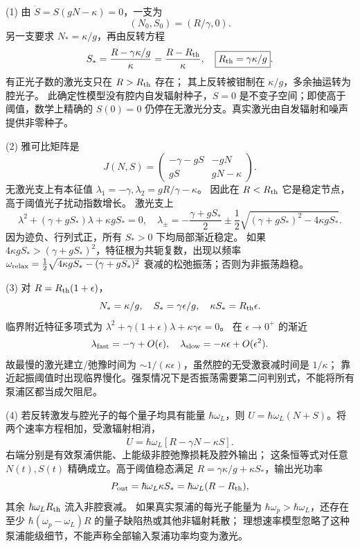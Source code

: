 (1) 由 \(\dot S=S(gN-\kappa)=0\)，一支为
\[
(N_0,S_0)=(R/\gamma,0).
\]
另一支要求 \(N_*=\kappa/g\)，再由反转方程
\[
S_*=\frac{R-\gamma\kappa/g}{\kappa}
=\frac{R-R_{\rm th}}{\kappa},\quad
\boxed{R_{\rm th}=\gamma\kappa/g}.
\]
有正光子数的激光支只在 \(R>R_{\rm th}\) 存在；
其上反转被钳制在 \(\kappa/g\)，多余抽运转为腔光子。
此确定性模型没有腔内自发辐射种子，\(S=0\) 是不变子空间；即使高于阈值，数学上精确的 \(S(0)=0\) 仍停在无激光分支。真实激光由自发辐射和噪声提供非零种子。

(2) 雅可比矩阵是
\[
J(N,S)=
\begin{pmatrix}-\gamma-gS&-gN\\gS&gN-\kappa\end{pmatrix}.
\]
无激光支上有本征值
\(\lambda_1=-\gamma,\lambda_2=gR/\gamma-\kappa\)。
因此在 \(R<R_{\rm th}\) 它是稳定节点，高于阈值光子扰动指数增长。
激光支上
\[
\lambda^2+(\gamma+gS_*)\lambda+\kappa gS_*=0,\quad
\lambda_\pm=-\frac{\gamma+gS_*}{2}
\pm\frac12\sqrt{(\gamma+gS_*)^2-4\kappa gS_*}.
\]
因为迹负、行列式正，所有 \(S_*>0\) 下均局部渐近稳定。
如果 \(4\kappa gS_*>(\gamma+gS_*)^2\)，特征根为共轭复数，出现以频率
\(\omega_{\rm relax}=\frac12\sqrt{4\kappa gS_*-(\gamma+gS_*)^2}\)
衰减的松弛振荡；否则为非振荡趋稳。

(3) 对 \(R=R_{\rm th}(1+\epsilon)\)，
\[
N_*=\kappa/g,\quad
S_*=\gamma\epsilon/g,\quad
\kappa S_*=R_{\rm th}\epsilon.
\]
临界附近特征多项式为
\(\lambda^2+\gamma(1+\epsilon)\lambda+\kappa\gamma\epsilon=0\)。
在 \(\epsilon\to0^+\) 的渐近
\[
\lambda_{\rm fast}=-\gamma+O(\epsilon),\quad
\lambda_{\rm slow}=-\kappa\epsilon+O(\epsilon^2).
\]
故最慢的激光建立/弛豫时间为
\(\sim1/(\kappa\epsilon)\)，虽然腔的无受激衰减时间是 \(1/\kappa\)；
靠近起振阈值时出现临界慢化。强泵情况下是否振荡需要第二问判别式，不能将所有泵浦区都当成欠阻尼。

(4) 若反转激发与腔光子的每个量子均具有能量 \(\hbar\omega_L\)，则
\(U=\hbar\omega_L(N+S)\)。将两个速率方程相加，受激辐射相消，
\[
\boxed{\dot U=\hbar\omega_L[R-\gamma N-\kappa S]}.
\]
右端分别是有效泵浦供能、上能级非腔弛豫损耗及腔外输出；
这条恒等式对任意 \(N(t),S(t)\) 精确成立。高于阈值稳态满足
\(R=\gamma\kappa/g+\kappa S_*\)，输出光功率
\[
P_{\rm out}=\hbar\omega_L\kappa S_*
=\hbar\omega_L(R-R_{\rm th}),
\]
其余 \(\hbar\omega_LR_{\rm th}\) 流入非腔衰减。
如果真实泵浦的每光子能量为 \(\hbar\omega_p>\hbar\omega_L\)，还存在至少
\(\hbar(\omega_p-\omega_L)R\) 的量子缺陷热或其他非辐射耗散；
理想速率模型忽略了这种泵浦能级细节，不能声称全部输入泵浦功率均变为激光。
